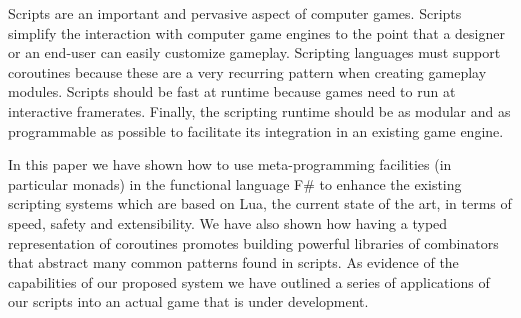 
Scripts are an important and pervasive aspect of computer games. Scripts simplify the interaction with computer game engines to the point that a designer or an end-user can easily customize gameplay. Scripting languages must support coroutines because these are a very recurring pattern when creating gameplay modules. Scripts should be fast at runtime because games need to run at interactive framerates. Finally, the scripting runtime should be as modular and as programmable as possible to facilitate its integration in an existing game engine.

In this paper we have shown how to use meta-programming facilities (in particular monads) in the functional language F\# to enhance the existing scripting systems which are based on Lua, the current state of the art, in terms of speed, safety and extensibility. We have also shown how having a typed representation of coroutines promotes building powerful libraries of combinators that abstract many common patterns found in scripts. As evidence of the capabilities of our proposed system we have outlined a series of applications of our scripts into an actual game that is under development.
